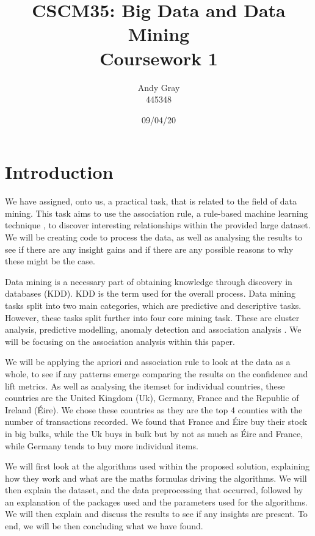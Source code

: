 \documentclass[a4paper,10pt]{article}
\begin{document}
\title{\textbf{CSCM35: Big Data and Data Mining \\Coursework 1}}
\date{09/04/20}
\author{Andy Gray\\445348}

\maketitle

\section{Introduction}

We have assigned, onto us, a practical task, that is related to the field of data mining. This task aims to use the association rule, a rule-based machine learning technique \cite{geron2019hands}, to discover interesting relationships within the provided large dataset. We will be creating code to process the data, as well as analysing the results to see if there are any insight gains and if there are any possible reasons to why these might be the case. 

Data mining is a necessary part of obtaining knowledge through discovery in databases (KDD). KDD is the term used for the overall process. Data mining tasks split into two main categories, which are predictive and descriptive tasks. However, these tasks split further into four core mining task. These are cluster analysis, predictive modelling, anomaly detection and association analysis \cite{tan2016introduction}. We will be focusing on the association analysis within this paper.

We will be applying the apriori and association rule to look at the data as a whole, to see if any patterns emerge comparing the results on the confidence and lift metrics. As well as analysing the itemset for individual countries, these countries are the United Kingdom (Uk), Germany, France and the Republic of Ireland (Éire). We chose these countries as they are the top 4 counties with the number of transactions recorded. We found that France and Éire buy their stock in big bulks, while the Uk buys in bulk but by not as much as Éire and France, while Germany tends to buy more individual items.

We will first look at the algorithms used within the proposed solution, explaining how they work and what are the maths formulas driving the algorithms. We will then explain the dataset, and the data preprocessing that occurred, followed by an explanation of the packages used and the parameters used for the algorithms. We will then explain and discuss the results to see if any insights are present. To end, we will be then concluding what we have found.
\end{document}
